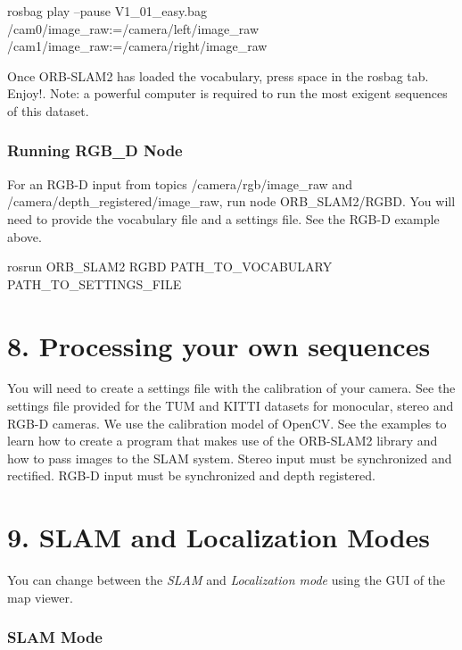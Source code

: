 \begin{DoxyCode}
rosbag play --pause V1\_01\_easy.bag /cam0/image\_raw:=/camera/left/image\_raw
       /cam1/image\_raw:=/camera/right/image\_raw
\end{DoxyCode}


Once O\+R\+B-\/\+S\+L\+A\+M2 has loaded the vocabulary, press space in the rosbag tab. Enjoy!. Note\+: a powerful computer is required to run the most exigent sequences of this dataset.

\subsubsection*{Running R\+G\+B\+\_\+D Node}

For an R\+G\+B-\/D input from topics {\ttfamily /camera/rgb/image\+\_\+raw} and {\ttfamily /camera/depth\+\_\+registered/image\+\_\+raw}, run node O\+R\+B\+\_\+\+S\+L\+A\+M2/\+R\+G\+BD. You will need to provide the vocabulary file and a settings file. See the R\+G\+B-\/D example above.


\begin{DoxyCode}
rosrun ORB\_SLAM2 RGBD PATH\_TO\_VOCABULARY PATH\_TO\_SETTINGS\_FILE
\end{DoxyCode}


\section*{8. Processing your own sequences}

You will need to create a settings file with the calibration of your camera. See the settings file provided for the T\+UM and K\+I\+T\+TI datasets for monocular, stereo and R\+G\+B-\/D cameras. We use the calibration model of Open\+CV. See the examples to learn how to create a program that makes use of the O\+R\+B-\/\+S\+L\+A\+M2 library and how to pass images to the S\+L\+AM system. Stereo input must be synchronized and rectified. R\+G\+B-\/D input must be synchronized and depth registered.

\section*{9. S\+L\+AM and Localization Modes}

You can change between the {\itshape S\+L\+AM} and {\itshape Localization mode} using the G\+UI of the map viewer.

\subsubsection*{S\+L\+AM Mode}

